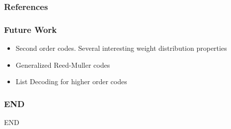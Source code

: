 \documentclass[xcolor=xvgnames]{beamer}
\newcommand{\rem}{Reed-Muller}
\begin{document}
\begin{frame}
  \frametitle{References}

\end{frame}

\begin{frame}
\frametitle{Future Work}
\begin{itemize}
 \item Second order codes. Several interesting weight distribution properties
\item  Generalized \rem{} codes
\item List Decoding for higher order codes
\end{itemize}



\end{frame}

\begin{frame}
\frametitle{END}
END \\


\end{frame}

\end{document}
